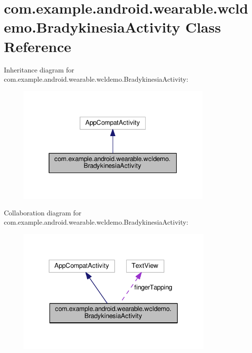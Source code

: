 \hypertarget{classcom_1_1example_1_1android_1_1wearable_1_1wcldemo_1_1BradykinesiaActivity}{}\section{com.\+example.\+android.\+wearable.\+wcldemo.\+Bradykinesia\+Activity Class Reference}
\label{classcom_1_1example_1_1android_1_1wearable_1_1wcldemo_1_1BradykinesiaActivity}


Inheritance diagram for com.\+example.\+android.\+wearable.\+wcldemo.\+Bradykinesia\+Activity\+:
\nopagebreak
\begin{figure}[H]
\begin{center}
\leavevmode
\includegraphics[width=277pt]{d1/dfc/classcom_1_1example_1_1android_1_1wearable_1_1wcldemo_1_1BradykinesiaActivity__inherit__graph}
\end{center}
\end{figure}


Collaboration diagram for com.\+example.\+android.\+wearable.\+wcldemo.\+Bradykinesia\+Activity\+:
\nopagebreak
\begin{figure}[H]
\begin{center}
\leavevmode
\includegraphics[width=278pt]{da/d98/classcom_1_1example_1_1android_1_1wearable_1_1wcldemo_1_1BradykinesiaActivity__coll__graph}
\end{center}
\end{figure}
